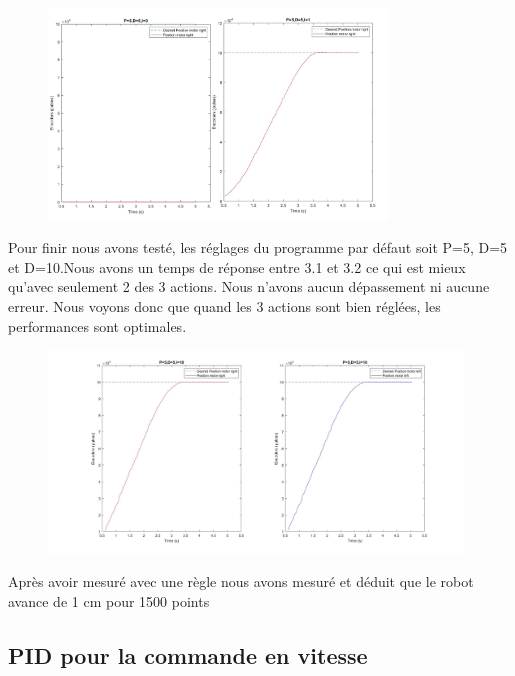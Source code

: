 \documentclass[a4paper]{article}
\begin{document}
		\begin{figure}[h]
			\centering
			\includegraphics[width = 9cm]{imgs/fig4.png}
			\caption{}
		\end{figure}
		Pour finir nous avons testé, les réglages du programme par défaut soit P=5, D=5 et D=10.Nous avons un temps de réponse entre 3.1 et 3.2 ce qui est mieux qu’avec seulement 2 des 3 actions. Nous n’avons aucun dépassement ni aucune erreur. Nous voyons donc que quand les 3 actions sont bien réglées, les performances sont optimales.
		
		\begin{figure}[h]
			\centering
			\includegraphics[width = 11cm]{imgs/fig5.jpg}
			\caption{}
		\end{figure}
		Après avoir mesuré avec une règle nous avons mesuré et déduit que le robot avance de 1 cm pour 1500 points 
		
	\subsection{PID pour la commande en vitesse}
	
\end{document}
